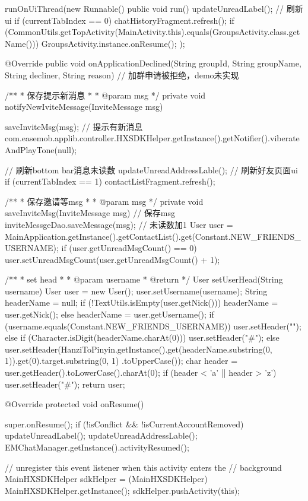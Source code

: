 {{{			runOnUiThread(new Runnable() {
				public void run() {
					updateUnreadLabel();
					// 刷新ui
					if (currentTabIndex == 0)
						chatHistoryFragment.refresh();
					if (CommonUtils.getTopActivity(MainActivity.this).equals(GroupsActivity.class.getName())) {
						GroupsActivity.instance.onResume();
					}
				}
			});
		}

		@Override
		public void onApplicationDeclined(String groupId, String groupName, String decliner, String reason) {
			// 加群申请被拒绝，demo未实现
		}

	}

	/**
	 * 保存提示新消息
	 * 
	 * @param msg
	 */
	private void notifyNewIviteMessage(InviteMessage msg) {
		saveInviteMsg(msg);
		// 提示有新消息
		com.easemob.applib.controller.HXSDKHelper.getInstance().getNotifier().viberateAndPlayTone(null);

		// 刷新bottom bar消息未读数
		updateUnreadAddressLable();
		// 刷新好友页面ui
		if (currentTabIndex == 1)
			contactListFragment.refresh();
	}

	/**
	 * 保存邀请等msg
	 * 
	 * @param msg
	 */
	private void saveInviteMsg(InviteMessage msg) {
		// 保存msg
		inviteMessgeDao.saveMessage(msg);
		// 未读数加1
		User user = MainApplication.getInstance().getContactList().get(Constant.NEW_FRIENDS_USERNAME);
		if (user.getUnreadMsgCount() == 0)
			user.setUnreadMsgCount(user.getUnreadMsgCount() + 1);
	}

	/**
	 * set head
	 * 
	 * @param username
	 * @return
	 */
	User setUserHead(String username) {
		User user = new User();
		user.setUsername(username);
		String headerName = null;
		if (!TextUtils.isEmpty(user.getNick())) {
			headerName = user.getNick();
		} else {
			headerName = user.getUsername();
		}
		if (username.equals(Constant.NEW_FRIENDS_USERNAME)) {
			user.setHeader("");
		} else if (Character.isDigit(headerName.charAt(0))) {
			user.setHeader("#");
		} else {
			user.setHeader(HanziToPinyin.getInstance().get(headerName.substring(0, 1)).get(0).target.substring(0, 1)
					.toUpperCase());
			char header = user.getHeader().toLowerCase().charAt(0);
			if (header < 'a' || header > 'z') {
				user.setHeader("#");
			}
		}
		return user;
	}

	@Override
	protected void onResume() {
		super.onResume();
		if (!isConflict && !isCurrentAccountRemoved) {
			updateUnreadLabel();
			updateUnreadAddressLable();
			EMChatManager.getInstance().activityResumed();
		}

		// unregister this event listener when this activity enters the
		// background
		MainHXSDKHelper sdkHelper = (MainHXSDKHelper) MainHXSDKHelper.getInstance();
		sdkHelper.pushActivity(this);

}}
